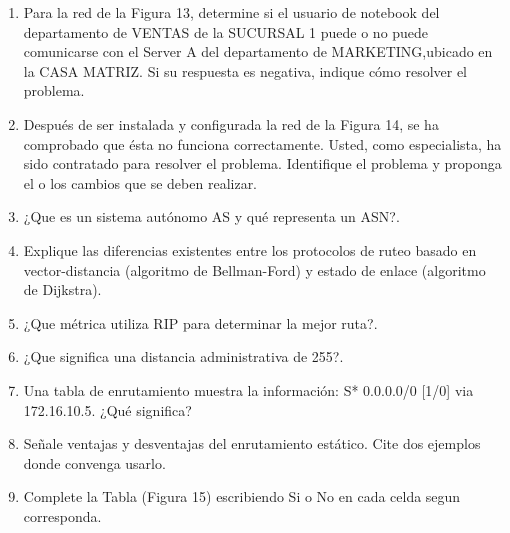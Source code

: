 \documentclass{udparticle}
\begin{document}
\begin{enumerate}
\item Para la red de la Figura 13, determine si el usuario de notebook del 
departamento de VENTAS de la SUCURSAL 1 puede o no puede comunicarse con el Server 
A del departamento de MARKETING,ubicado en la CASA MATRIZ. Si su respuesta es 
negativa, indique cómo resolver el problema.

\item Después de ser instalada y configurada la red de la Figura 14, se ha 
comprobado que ésta no funciona correctamente. Usted, como especialista, ha sido 
contratado para resolver el problema. Identifique el problema y proponga el o los 
cambios que se deben realizar.

\item ¿Que es un sistema autónomo AS y qué representa un ASN?.
\item Explique las diferencias existentes entre los protocolos de ruteo basado en
vector-distancia (algoritmo de Bellman-Ford) y estado de enlace (algoritmo de Dijkstra).

\item ¿Que métrica utiliza RIP para determinar la mejor ruta?.
\item ¿Que significa una distancia administrativa de 255?.
\item Una tabla de enrutamiento muestra la información: S* 0.0.0.0/0 [1/0] via 172.16.10.5. ¿Qué significa?
\item Señale ventajas y desventajas del enrutamiento estático. Cite dos ejemplos donde convenga usarlo.
\item Complete la Tabla (Figura 15) escribiendo Si o No en cada celda segun corresponda.


\end{enumerate}
\end{document}
